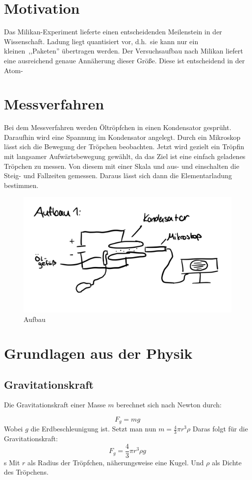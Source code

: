 \section{Motivation}
Das Milikan-Experiment lieferte einen entscheidenden Meilenstein in der Wissenschaft.
Ladung liegt quantisiert vor, d.h.\ sie kann nur ein kleinen\ ,,Paketen'' übertragen werden. Der Versuchsaufbau
nach Milikan liefert eine ausreichend genaue Annäherung dieser Größe.
Diese ist entscheidend in der Atom-


\section{Messverfahren}
Bei dem Messverfahren werden Öltröpfchen in einen Kondensator gesprüht. Daraufhin wird eine Spannung im Kondensator angelegt.
Durch ein Mikroskop lässt sich die Bewegung der Tröpchen beobachten. Jetzt wird gezielt ein Tröpfin mit langsamer Aufwärtsbewegung gewählt, da das Ziel ist eine einfach geladenes Tröpchen zu messen.
Von diesem mit einer Skala und aus- und einschalten die Steig- und Fallzeiten gemessen.
Daraus lässt sich dann die Elementarladung bestimmen.

\begin{figure}[h!]
    \centering
    \includegraphics[width = .5\textwidth]{Aufbau.jpeg}
    \caption{Aufbau}
\end{figure}

\section{Grundlagen aus der Physik}
\subsection{Gravitationskraft}

Die Gravitationskraft einer Masse $m$ berechnet sich nach Newton durch:

\begin{equation}
    F_g = mg
\end{equation}
Wobei $g$ die Erdbeschleunigung ist. Setzt man nun $m=\frac{4}{3}\pi r^3 \rho$
Daras folgt für die Gravitationskraft:
\begin{equation}
    F_g = \frac{4}{3}\pi r^3 \rho g
\end{equation}s
Mit $r$ als Radius der Tröpfchen, näherungsweise eine Kugel. Und $\rho$ als Dichte des Tröpchens.
